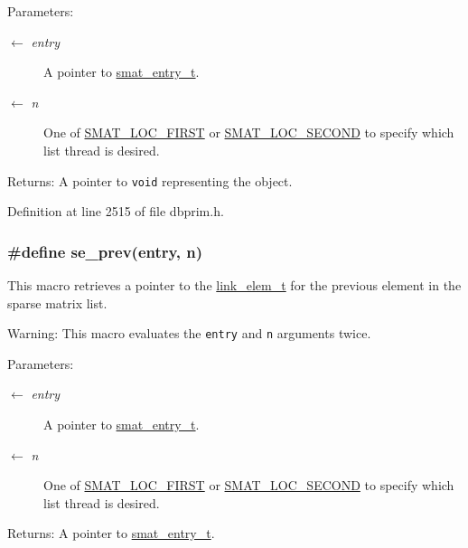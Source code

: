 \begin{Desc}
\item[Parameters:]
\begin{description}
\item[\mbox{$\leftarrow$} {\em entry}]A pointer to \hyperlink{group__dbprim__smat_ga2}{smat\_\-entry\_\-t}. \item[\mbox{$\leftarrow$} {\em n}]One of \hyperlink{group__dbprim__smat_gga70a137}{SMAT\_\-LOC\_\-FIRST} or \hyperlink{group__dbprim__smat_gga70a138}{SMAT\_\-LOC\_\-SECOND} to specify which list thread is desired.\end{description}
\end{Desc}
\begin{Desc}
\item[Returns:]A pointer to {\tt void} representing the object.\end{Desc}


Definition at line 2515 of file dbprim.h.\hypertarget{group__dbprim__smat_ga63}{
\subsubsection[se\_\-prev]{\setlength{\rightskip}{0pt plus 5cm}\#define se\_\-prev(entry, n)}}
\label{group__dbprim__smat_ga63}


This macro retrieves a pointer to the \hyperlink{group__dbprim__link_ga1}{link\_\-elem\_\-t} for the previous element in the sparse matrix list.

\begin{Desc}
\item[Warning:]This macro evaluates the {\tt entry} and {\tt n} arguments twice.\end{Desc}
\begin{Desc}
\item[Parameters:]
\begin{description}
\item[\mbox{$\leftarrow$} {\em entry}]A pointer to \hyperlink{group__dbprim__smat_ga2}{smat\_\-entry\_\-t}. \item[\mbox{$\leftarrow$} {\em n}]One of \hyperlink{group__dbprim__smat_gga70a137}{SMAT\_\-LOC\_\-FIRST} or \hyperlink{group__dbprim__smat_gga70a138}{SMAT\_\-LOC\_\-SECOND} to specify which list thread is desired.\end{description}
\end{Desc}
\begin{Desc}
\item[Returns:]A pointer to \hyperlink{group__dbprim__smat_ga2}{smat\_\-entry\_\-t}.\end{Desc}



